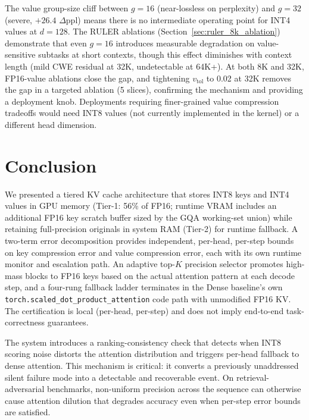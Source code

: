 \documentclass[10pt,twocolumn,a4paper]{article}
\theoremstyle{definition}
\theoremstyle{remark}
\newcommand{\torchsdpa}{\texttt{torch.scaled\_\hspace{0pt}dot\_\hspace{0pt}product\_\hspace{0pt}attention}}
\begin{document}
The value group-size cliff between $g{=}16$ (near-lossless on perplexity) and $g{=}32$ (severe, $+26.4$ $\Delta$ppl) means there is no intermediate operating point for INT4 values at $d{=}128$.  The RULER ablations (Section~\ref{sec:ruler_8k_ablation}) demonstrate that even $g{=}16$ introduces measurable degradation on value-sensitive subtasks at short contexts, though this effect diminishes with context length (mild CWE residual at 32K, undetectable at 64K+).  At both 8K and 32K, FP16-value ablations close the gap, and tightening $v_{\mathrm{tol}}$ to 0.02 at 32K removes the gap in a targeted ablation (5 slices), confirming the mechanism and providing a deployment knob.  Deployments requiring finer-grained value compression tradeoffs would need INT8 values (not currently implemented in the kernel) or a different head dimension.


\section{Conclusion}
\label{sec:conclusion}

We presented a tiered KV cache architecture that stores INT8 keys and INT4 values in GPU memory (Tier-1: 56\% of FP16; runtime VRAM includes an additional FP16 key scratch buffer sized by the GQA working-set union) while retaining full-precision originals in system RAM (Tier-2) for runtime fallback.  A two-term error decomposition provides independent, per-head, per-step bounds on key compression error and value compression error, each with its own runtime monitor and escalation path.  An adaptive top-$K$ precision selector promotes high-mass blocks to FP16 keys based on the actual attention pattern at each decode step, and a four-rung fallback ladder terminates in the Dense baseline's own \torchsdpa{} code path with unmodified FP16 KV.  The certification is local (per-head, per-step) and does not imply end-to-end task-correctness guarantees.

The system introduces a ranking-consistency check that detects when INT8 scoring noise distorts the attention distribution and triggers per-head fallback to dense attention.  This mechanism is critical: it converts a previously unaddressed silent failure mode into a detectable and recoverable event.  On retrieval-adversarial benchmarks, non-uniform precision across the sequence can otherwise cause attention dilution that degrades accuracy even when per-step error bounds are satisfied.
\end{document}
